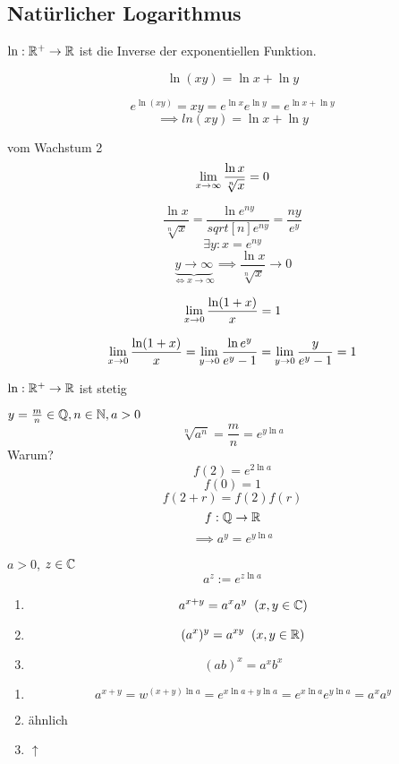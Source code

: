 \subsection{Natürlicher Logarithmus}
\begin{Def}
  $\ln:\mathbb{R}^+\to\mathbb{R}$ ist die Inverse der exponentiellen Funktion.
\end{Def}
\begin{Sat}
  \[\ln(xy)=\ln x + \ln y\]
\end{Sat}
\begin{Bew}
  \[e^{\ln(xy)}=xy=e^{\ln x}e^{\ln y}=e^{\ln x + \ln y}\]
  \[\implies ln(xy)=\ln x + \ln y\]
\end{Bew}
\begin{Sat}{vom Wachstum 2} \label{s:wachstum2}
  \[\displaystyle\lim_{x\rightarrow\infty}\frac{\ln x}{\sqrt[n]{x}}=0\]
\end{Sat}
\begin{Bew}
  \[\frac{\ln x}{\sqrt[n]{x}}=\frac{\ln e^{ny}}{sqrt[n]{e^{ny}}}=\frac{ny}{e^y}\]
  \[\exists y:x=e^{ny}\]
  \[\underbrace{y\to\infty}_{\iff x\to\infty}\implies \frac{\ln x}{\sqrt[n]{x}}\to 0\]
\end{Bew}
\begin{Sat}
  \[\displaystyle\lim_{x\rightarrow0}\frac{\ln(1+x)}{x}=1\]
\end{Sat}
\begin{Bew}
  \[\displaystyle\lim_{x\rightarrow0}\frac{\ln(1+x)}{x}=\displaystyle\lim_{y\rightarrow0}\frac{\ln e^y}{e^y-1}=\displaystyle\lim_{y\rightarrow0}\frac{y}{e^y-1}=1\]
\end{Bew}
\begin{Bem}
  $\ln:\mathbb{R}^+\to\mathbb{R}$ ist stetig
\end{Bem}
\begin{Bem}
  $y=\frac{m}{n}\in\mathbb{Q}, n\in\mathbb{N}, a>0$
  \[\sqrt[n]{a^n}=\frac{m}{n}=e^{y\ln a}\]
  Warum?
  \[f(2)=e^{2\ln a}\]
  \[f(0)=1\]
  \[f(2+r)=f(2)f(r)\]
  \[f:\mathbb{Q}\to\mathbb{R}\]
  \[\implies a^y=e^{y\ln a}\]
\end{Bem}
\begin{Def}
  $a>0$, $z\in\mathbb{C}$
  \[a^z:=e^{z\ln a}\]
\end{Def}
\begin{Sat}
  \begin{enumerate}
    \item \[a^{x+y}=a^xa^y\hspace{2mm}(x,y\in\mathbb{C})\]
    \item \[(a^x)^y=a^{xy}\hspace{2mm}(x,y\in\mathbb{R})\]
    \item \[(ab)^x=a^xb^x\]
  \end{enumerate}
\end{Sat}
\begin{Bew}
  \begin{enumerate}
    \item \[a^{x+y}=w^{(x+y)\ln a}=e^{x\ln a+y\ln a}=e^{x\ln a}e^{y\ln a}=a^xa^y\]
    \item ähnlich
    \item $\uparrow$
  \end{enumerate}
\end{Bew}
